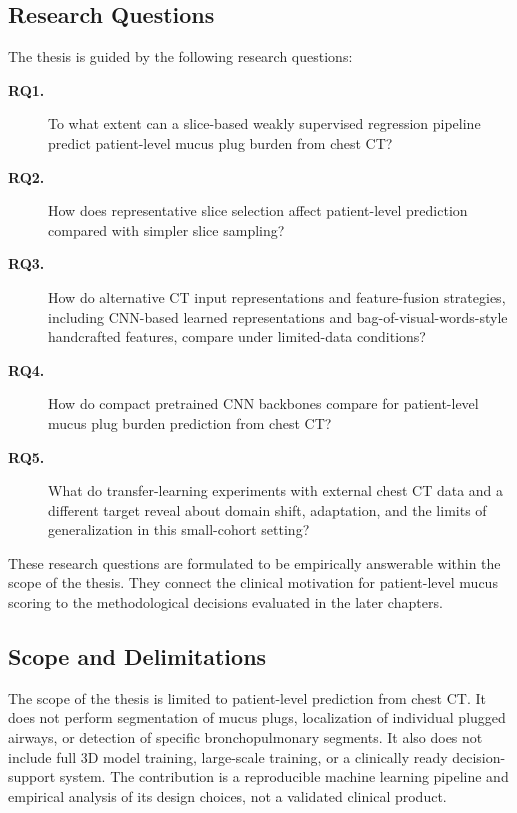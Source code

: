 \subsection{Research Questions}
The thesis is guided by the following research questions:

\begin{description}
    \item[\textbf{RQ1.}] To what extent can a slice-based weakly supervised regression pipeline predict patient-level mucus plug burden from chest CT?
    
    \item[\textbf{RQ2.}] How does representative slice selection affect patient-level prediction compared with simpler slice sampling?
    
    \item[\textbf{RQ3.}] How do alternative CT input representations and feature-fusion strategies, including CNN-based learned representations and bag-of-visual-words-style handcrafted features, compare under limited-data conditions?
    
    \item[\textbf{RQ4.}] How do compact pretrained CNN backbones compare for patient-level mucus plug burden prediction from chest CT?
    
    \item[\textbf{RQ5.}] What do transfer-learning experiments with external chest CT data and a different target reveal about domain shift, adaptation, and the limits of generalization in this small-cohort setting?
\end{description}

These research questions are formulated to be empirically answerable within the scope of the thesis. They connect the clinical motivation for patient-level mucus scoring to the methodological decisions evaluated in the later chapters.


\subsection{Scope and Delimitations}
The scope of the thesis is limited to patient-level prediction from chest CT. It does not perform segmentation of mucus plugs, localization of individual plugged airways, or detection of specific bronchopulmonary segments. It also does not include full 3D model training, large-scale training, or a clinically ready decision-support system. The contribution is a reproducible machine learning pipeline and empirical analysis of its design choices, not a validated clinical product.

